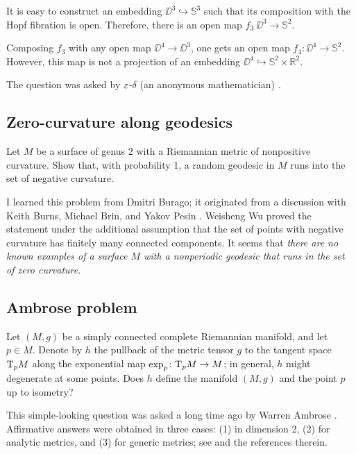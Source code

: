 It is easy to construct an embedding $\DD^3\hookrightarrow \mathbb{S}^3$
such that its composition with the Hopf fibration is open.
Therefore, there is an open map $f_3\:\DD^3\to\mathbb{S}^2$.

Composing $f_3$ with any open map $\DD^4\to \DD^3$,
one gets an open map $f_4:\DD^4\to \mathbb{S}^2$.
However, this map is not a projection of an embedding $\DD^4\hookrightarrow \mathbb{S}^2\times
\mathbb R^2$.

The question was asked by $\varepsilon$-$\delta$ (an anonymous mathematician)  \cite{epsilon-delta}.

\subsection{Zero-curvature along geodesics}

\begin{pr}
Let $M$ be a surface of genus 2 with a Riemannian metric of nonpositive curvature.
Show that, with probability 1, a random geodesic in $M$ runs into the set of negative curvature.
\end{pr}

I learned this problem from Dmitri Burago; it originated from a discussion with Keith Burns, Michael Brin, and Yakov Pesin \cite[see also][]{hertz}.
Weisheng Wu \cite{wu2015} proved the statement under the additional assumption that the set of points with negative curvature has finitely many connected components.
It seems that \textit{there are no known examples of a surface $M$ with a nonperiodic geodesic that runs in the set of zero curvature}.

\subsection{Ambrose problem}

\begin{pr}
Let $(M,g)$ be a simply connected complete Riemannian manifold, and let $p\in M$.
Denote by $h$ the pullback of the metric tensor $g$ to the tangent space $\mathrm{T}_pM$ along the exponential map $\exp_p\:\T_pM\z\to M$;
in general, $h$ might degenerate at some points.
Does $h$ define the manifold $(M,g)$ and the point $p$ up to isometry? 
\end{pr}

This simple-looking question was asked a long time ago by Warren Ambrose \cite{ambrose}.
Affirmative answers were obtained in three cases: (1) in dimension 2, (2) for analytic metrics, and (3) for generic metrics; see \cite{hebda1994, hebda2010, itoh, ardoy} and the references therein.


